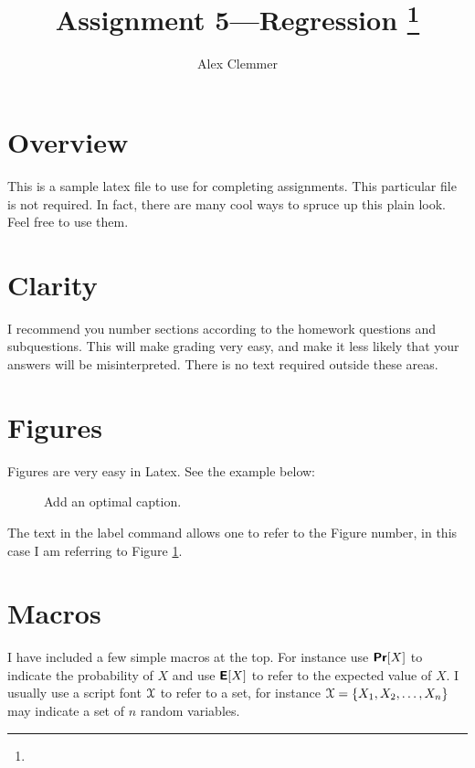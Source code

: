 \documentclass[11pt]{article}
\title{Assignment 5---Regression
\footnote{\s{CS 6955 Data Mining; \;\; Spring 2012 \hfill
Instructor: Jeff M. Phillips, University of Utah}
}
}
\author{Alex Clemmer}
\renewcommand{\c}[1]{\ensuremath{\EuScript{#1}}}
\newcommand{\s}[1]{\textsf{#1}}
\newcommand{\E}{\textbf{\textsf{E}}}
\renewcommand{\Pr}{\textbf{\textsf{Pr}}}
\begin{document}
\maketitle





\section{Overview}

This is a sample latex file to use for completing assignments.  This particular file is not required.  In fact, there are many cool ways to spruce up this plain look.  Feel free to use them.  

\section{Clarity}
I recommend you number sections according to the homework questions and subquestions.  This will make grading very easy, and make it less likely that your answers will be misinterpreted.  There is no text required outside these areas.  

\section{Figures}
Figures are very easy in Latex.  See the example below:

\begin{figure}[h]
\caption{Add an optimal caption.}
\label{fig:name}
\end{figure}

The text in the \s{label} command allows one to refer to the Figure number, in this case I am referring to Figure \ref{fig:name}.  

\section{Macros}
I have included a few simple macros at the top.  For instance use $\Pr[X]$ to indicate the probability of $X$ and use $\E[X]$ to refer to the expected value of $X$.  I usually use a script font $\c{X}$ to refer to a set, for instance $\c{X} = \{X_1, X_2, \ldots, X_n\}$ may indicate a set of $n$ random variables.  
\end{document}
